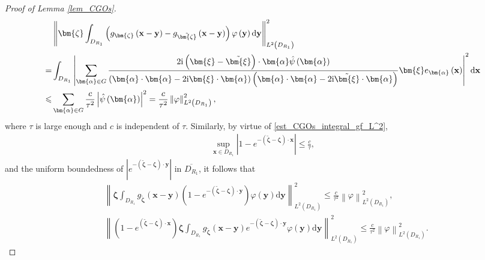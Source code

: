 \documentclass[11pt,reqno,oneside]{amsart}
\theoremstyle{definition}
\theoremstyle{remark}
\numberwithin{equation}{section}
\numberwithin{equation}{section}
\theoremstyle{remark}
\begin{document}
\begin{proof}[Proof of Lemma \ref{lem_CGOs}]
	\begin{align} \label{eq_CGOs_zeta_g-g_varphi}
		& \left\| \bm{\zeta} \int_{D_{R_1}} \left(g_{\bm{\zeta}}\left(\mathbf{x} - \mathbf{y}\right) - g_{\tilde{\bm{\zeta}}}\left(\mathbf{x} - \mathbf{y}\right)\right) \varphi \left(\mathbf{y}\right) \mathrm{d} \mathbf{y} \right\|^2_{L^2\left(D_{R_1}\right)} \notag \\	
		= & \int_{D_{R_1}} \left| \sum_{\bm{\alpha} \in G} \frac{2\mathrm{i}\left( \bm{\xi}-\tilde{\bm{\xi}} \right) \cdot \bm{\alpha} \hat{\psi}\left(\bm{\alpha}\right)}{\left(\bm{\alpha} \cdot \bm{\alpha} - 2\mathrm{i} \bm{\xi} \cdot \bm{\alpha}\right)\left(\bm{\alpha} \cdot \bm{\alpha} - 2\mathrm{i} \tilde{\bm{\xi}} \cdot \bm{\alpha}\right)} \bm{\xi} e_{\bm{\alpha}} \left(\mathbf{x}\right) \right|^2 \mathrm{d} \mathbf{x} \notag \\
		\leqslant & \sum_{\bm{\alpha} \in G} \frac{c}{\tau^2} \left|\hat{\psi}\left(\bm{\alpha}\right)\right|^2 = \frac{c}{\tau^2} \left\| \varphi \right\|^2_{L^2\left(D_{R_1}\right)} ,
	\end{align}
	where $ \tau $ is large enough and $ c $ is independent of $ \tau $. Similarly, by virtue of \eqref{est_CGOs_integral_gf_L^2}, 
	\begin{align} \label{ineq_CGOs_sup_1-e}
		\sup_{\mathbf{x} \in D_{R_1}} \left| 1 - e^{-\left(\tilde{\bm{\zeta}}-\bm{\zeta}\right) \cdot \mathbf{x}} \right| \leqslant \frac{c}{\tau}, 
	\end{align}	
	and the uniform boundedness of $ \left| e^{-\left(\tilde{\bm{\zeta}}-\bm{\zeta}\right) \cdot \mathbf{y}} \right| $ in $ \overline{D_{R_1}} $, it follows that
	\begin{align} 
		\label{est_CGOs_zeta_int_g_1-e_varphi}
		& \left\| \bm{\zeta} \int_{D_{R_1}} g_{\tilde{\bm{\zeta}}}\left(\mathbf{x} - \mathbf{y}\right) \left(1 - e^{-\left(\tilde{\bm{\zeta}}-\bm{\zeta}\right) \cdot \mathbf{y}} \right) \varphi \left(\mathbf{y}\right) \mathrm{d} \mathbf{y} \right\|^2_{L^2\left(D_{R_1}\right)} \leqslant \frac{c}{\tau^2} \left\| \varphi \right\|^2_{L^2\left(D_{R_1}\right)} , \\
		\label{est_CGOs_1-ezeta_int_gevarphi}
		& \left\| \left(1 - e^{\left(\tilde{\bm{\zeta}}-\bm{\zeta}\right) \cdot \mathbf{x}} \right) \bm{\zeta} \int_{D_{R_1}} g_{\tilde{\bm{\zeta}}}\left(\mathbf{x} - \mathbf{y}\right) e^{-\left(\tilde{\bm{\zeta}}-\bm{\zeta}\right) \cdot \mathbf{y}} \varphi \left(\mathbf{y}\right) \mathrm{d} \mathbf{y} \right\|^2_{L^2\left(D_{R_1}\right)}  \leqslant \frac{c}{\tau^2} \left\| \varphi \right\|^2_{L^2\left(D_{R_1}\right)} .

\end{align}
\end{proof}
\end{document}
